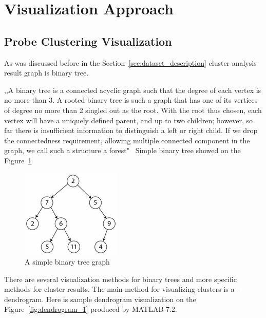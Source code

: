 \section{Visualization Approach}
\label{sec:solution}

\subsection{Probe Clustering Visualization}
\label{sec:cluster}

As was discussed before in the Section~\ref{sec:dataset_description} cluster analysis result graph is binary tree.

,,A binary tree is a connected acyclic graph such that the degree of each vertex is no more than 3. A rooted binary tree is such a graph that has one of its vertices of degree no more than 2 singled out as the root. With the root thus chosen, each vertex will have a uniquely defined parent, and up to two children; however, so far there is insufficient information to distinguish a left or right child. If we drop the connectedness requirement, allowing multiple connected component in the graph, we call such a structure a forest"~\cite{BINARY_TREE} Simple binary tree showed on the Figure~\ref{fig:simple_binary_tree}

\begin{figure}[h!]
\centering
\includegraphics[scale=1.0]{pictures/simple_binary_tree.png}
\caption{A simple binary tree graph}
\label{fig:simple_binary_tree}
\end{figure}

There are several visualization methods for binary trees and more specific methods for cluster results. The main method for visualizing clusters is a -- dendrogram. Here is sample dendrogram visualization on the Figure~\ref{fig:dendrogram_1} produced by MATLAB 7.2.

